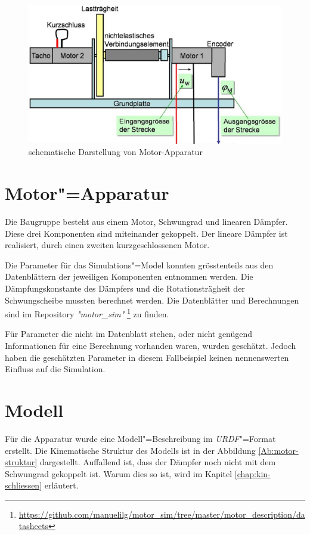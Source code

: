 \begin{figure}[ht!]
	\centering
	\includegraphics[width=14.5cm]{images/motor_baugruppe.png} %
	\caption{schematische Darstellung von Motor-Apparatur}
	\label{Ab:motor-baugruppe}
\end{figure}

\section{Motor"=Apparatur}
Die Baugruppe besteht aus einem Motor, Schwungrad und linearen Dämpfer.
Diese drei Komponenten sind miteinander gekoppelt.
Der lineare Dämpfer ist realisiert, durch einen zweiten kurzgeschlossenen Motor.

Die Parameter für das Simulations"=Model konnten grösstenteils aus den Datenblättern der jeweiligen Komponenten entnommen werden. 
Die Dämpfungskonstante des Dämpfers und die Rotationsträgheit der Schwungscheibe mussten berechnet werden.
Die Datenblätter und Berechnungen sind im Repository \textit{\textsc{"}motor\_sim\textit{"}} \footnote{\url{https://github.com/manuelilg/motor\_sim/tree/master/motor\_description/datasheets}} zu finden. 

Für Parameter die nicht im Datenblatt stehen, oder nicht genügend Informationen für eine Berechnung vorhanden waren, wurden geschätzt.
Jedoch haben die geschätzten Parameter in diesem Fallbeispiel keinen nennenswerten Einfluss auf die Simulation.


\section{Modell}
Für die Apparatur wurde eine Modell"=Beschreibung im \textit{URDF}"=Format erstellt.
Die Kinematische Struktur des Modells ist in der Abbildung \ref{Ab:motor-struktur} dargestellt.
Auffallend ist, dass der Dämpfer noch nicht mit dem Schwungrad gekoppelt ist.
Warum dies so ist, wird im Kapitel \ref{chap:kin-schliessen} erläutert.

